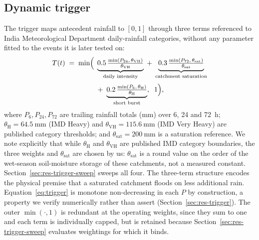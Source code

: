 \documentclass[journal]{IEEEtran}
\newcommand{\Tt}{T(t)}
\begin{document}
\subsection{Dynamic trigger}
\label{sec:method-trigger}
The trigger maps antecedent rainfall to $[0,1]$ through three terms referenced to
India Meteorological Department daily-rainfall categories, without any parameter
fitted to the events it is later tested on:
\begin{equation}
\begin{aligned}
\Tt \;=\; \min\Bigl(\;
&\underbrace{0.5\,\tfrac{\min(P_{24},\,\theta_{\mathrm{VH}})}{\theta_{\mathrm{VH}}}}_{\text{daily intensity}}
\;+\; \underbrace{0.3\,\tfrac{\min(P_{72},\,\theta_{\mathrm{sat}})}{\theta_{\mathrm{sat}}}}_{\text{catchment saturation}} \\[2pt]
&+\; \underbrace{0.2\,\tfrac{\min(P_{6},\,\theta_{\mathrm{H}})}{\theta_{\mathrm{H}}}}_{\text{short burst}},
\;\; 1 \Bigr),
\end{aligned}
\label{eq:trigger}
\end{equation}
where $P_{6},P_{24},P_{72}$ are trailing rainfall totals (\si{\milli\metre}) over
6, 24 and \SI{72}{\hour}; $\theta_{\mathrm{H}}=\SI{64.5}{\milli\metre}$ (IMD
Heavy) and $\theta_{\mathrm{VH}}=\SI{115.6}{\milli\metre}$ (IMD Very Heavy) are
published category thresholds; and $\theta_{\mathrm{sat}}=\SI{200}{\milli\metre}$
is a saturation reference. We note explicitly that while $\theta_{\mathrm{H}}$
and $\theta_{\mathrm{VH}}$ are published IMD category boundaries, the three
weights and $\theta_{\mathrm{sat}}$ are chosen by us: $\theta_{\mathrm{sat}}$ is
a round value on the order of the wet-season soil-moisture storage of these
catchments, not a measured constant. Section~\ref{sec:res-trigger-sweep} sweeps
all four. The three-term structure encodes the physical premise
that a saturated catchment floods on less additional rain. Equation~\eqref{eq:trigger}
is monotone non-decreasing in each $P$ by construction, a property we verify
numerically rather than assert (Section~\ref{sec:res-trigger}). The outer
$\min(\cdot,1)$ is redundant at the operating weights, since they sum to one and
each term is individually capped, but is retained because
Section~\ref{sec:res-trigger-sweep} evaluates weightings for which it binds.
\end{document}
